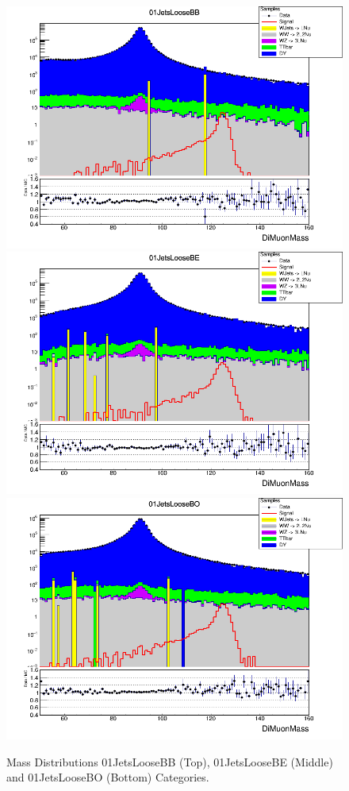 \begin{figure}[H]
  \centering
  \includegraphics[width=0.65\linewidth]{figures/ch_higgs/distributions/baseline_kalman/distribution__01JetsLooseBB__DiMuonMass__logY.png}\\
  \includegraphics[width=0.65\linewidth]{figures/ch_higgs/distributions/baseline_kalman/distribution__01JetsLooseBE__DiMuonMass__logY.png}\\
  \includegraphics[width=0.65\linewidth]{figures/ch_higgs/distributions/baseline_kalman/distribution__01JetsLooseBO__DiMuonMass__logY.png}
  \caption{Mass Distributions 01JetsLooseBB (Top), 01JetsLooseBE (Middle) and 01JetsLooseBO (Bottom) Categories.}
  \label{fig:higgs_categorization_01jetsloosebbbebo}
\end{figure}
